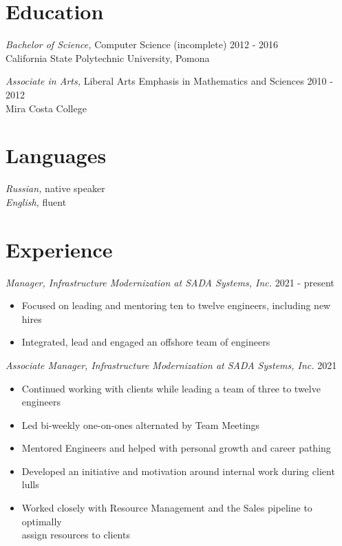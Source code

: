 \documentclass[line]{docs/resume/res}
\begin{document}
\address{https://smaslennikov.com}
\address{Email: me@smaslennikov.com}

\begin{resume}

\section{Education}
  {\sl Bachelor of Science,} Computer Science (incomplete) \hfill 2012 - 2016 \\
  California State Polytechnic University, Pomona

  {\sl Associate in Arts,} Liberal Arts Emphasis in Mathematics and Sciences \hfill 2010 - 2012 \\
  Mira Costa College

\section{Languages}
  {\sl Russian,} native speaker \\
  {\sl English,} fluent

\section{Experience}
  {\sl Manager, Infrastructure Modernization at SADA Systems, Inc.} \hfill 2021 - present
  \begin{itemize} \itemsep -2pt
    \item Focused on leading and mentoring ten to twelve engineers, including new hires
    \item Integrated, lead and engaged an offshore team of engineers
  \end{itemize}

  {\sl Associate Manager, Infrastructure Modernization at SADA Systems, Inc.} \hfill 2021
  \begin{itemize} \itemsep -2pt
    \item Continued working with clients while leading a team of three to twelve engineers
    \item Led bi-weekly one-on-ones alternated by Team Meetings
    \item Mentored Engineers and helped with personal growth and career pathing
    \item Developed an initiative and motivation around internal work during client lulls
    \item Worked closely with Resource Management and the Sales pipeline to optimally \\
      assign resources to clients
  \end{itemize}


\end{resume}
\end{document}
